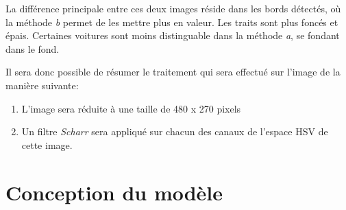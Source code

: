 La différence principale entre ces deux images réside dans les bords détectés, où la méthode \textit{b} permet de les mettre plus en valeur. Les traits sont plus foncés et épais. Certaines voitures sont moins distinguable dans la méthode \textit{a}, se fondant dans le fond.

Il sera donc possible de résumer le traitement qui sera effectué sur l'image de la manière suivante:
\begin{enumerate}
    \item L'image sera réduite à une taille de 480 x 270 pixels
    \item Un filtre \textit{Scharr} sera appliqué sur chacun des canaux de l'espace HSV de cette image.
\end{enumerate}

\section{Conception du modèle}